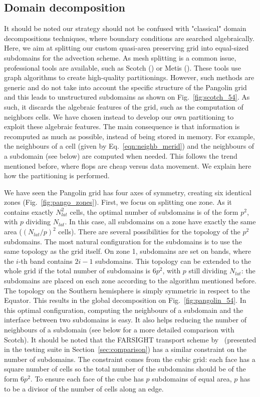 \subsection{Domain decomposition}
\label{subsec:domain_decompos}
It should be noted our strategy should not be confused with "classical" domain
decompositions techniques, where boundary conditions are searched algebraically.
Here, we aim at splitting our custom quasi-area preserving grid into equal-sized
subdomains for the advection scheme. As mesh splitting is a common issue,
professional tools are available, such as Scotch (\cite{Pellegrini2012}) or
Metis (\cite{Karypis1995}). These tools use graph algorithms to create
high-quality partitionings. However, such methods are generic and do not take
into account the specific structure of the Pangolin grid and this leads to
unstructured subdomains as shown on Fig.~\ref{fig:scotch_54}. As such, it discards
the algebraic features of the grid, such as the computation of neighbors cells.
We have chosen instead to develop our own partitioning to exploit these algebraic
features. The main consequence is that information is recomputed as much as
possible, instead of being stored in memory. For example, the neighbours of a
cell (given by Eq.~\eqref{eqn:neighb_merid}) and the neighbours of a subdomain (see below)
are computed when needed. This follows the trend mentioned before, where flops
are cheap versus data movement. We explain here how the partitioning is
performed.

We have seen the Pangolin grid has four axes of symmetry, creating six identical
zones (Fig.~\ref{fig:pango_zones}). First, we focus on splitting one zone.  As
it contains exactly $N_{lat}^2$ cells, the optimal number of subdomains is of
the form $p^2$, with $p$ dividing $N_{lat}$. In this case, all subdomains on a
zone have exactly the same area ($(N_{lat}/p)^2$ cells).  There are several
possibilities for the topology of the $p^2$ subdomains. The most natural
configuration for the subdomains is to use the same topology as the grid itself.
On zone 1, subdomains are set on bands, where the $i$-th band contains $2i-1$
subdomains.  This topology can be extended to the whole grid if the total number
of subdomains is $6p^2$, with $p$ still dividing $N_{lat}$: the subdomains are
placed on each zone according to the algorithm mentioned before. The topology on the
Southern hemisphere is simply symmetric in respect to the Equator.  This results
in the global decomposition on Fig.~\ref{fig:pangolin_54}. In this optimal
configuration, computing the neighbours of a subdomain and the interface between
two subdomains is easy. It also helps reducing the number of neighbours of a
subdomain (see below for a more detailed comparison with Scotch). It should be
noted that the FARSIGHT transport scheme by~\cite{White2011} (presented in the
testing suite in Section~\ref{sec:comparison}) has a similar constraint on the number
of subdomains. The constraint comes from the cubic grid: each face has a square
number of cells so the total number of the subdomains should be of the form
$6p^2$.  To ensure each face of the cube has $p$ subdomains of equal area, $p$
has to be a divisor of the number of cells along an edge.


